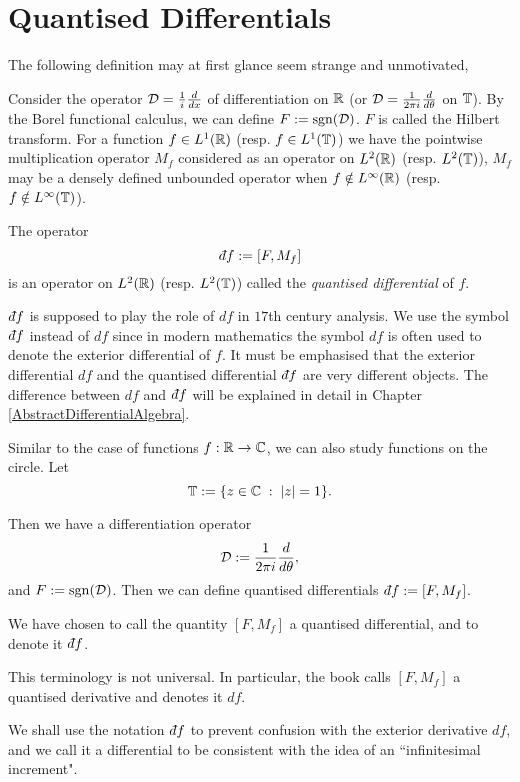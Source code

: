 \section{Quantised Differentials}
The following definition may at first glance seem strange and unmotivated,
\begin{definition}
    Consider the operator $\mathcal{D} = \frac{1}{i}\frac{d}{dx}$ of differentiation
    on $\mathbb{R}$ (or $\mathcal{D} = \frac{1}{2\pi i}\frac{d}{d\theta}$ on $\mathbb{T}$). By the Borel functional calculus, we can define $F := \operatorname{sgn}(\mathcal{D})$. 
    $F$ is called the Hilbert transform. For a function $f \in L^1(\mathbb{R})$ (resp. $f \in L^1(\mathbb{T})$)
    we have the pointwise multiplication
    operator $M_f$ considered as an operator on $L^2(\mathbb{R})$ (resp. $L^2(\mathbb{T})$), $M_f$
    may be a densely defined unbounded operator when $f \notin L^\infty(\mathbb{R})$ 
    (resp. $f \notin L^\infty(\mathbb{T})$).
    
    The operator
    \begin{equation}
        \qd f := [F,M_f]
    \end{equation}
    is an operator on $L^2(\mathbb{R})$ (resp. $L^2(\mathbb{T})$)
    called the \emph{quantised differential} of $f$.
\end{definition}

$\qd f$ is supposed to play the role of $df$ in $17$th century analysis. 
We use the symbol $\qd f$ instead of $df$ since in modern mathematics the symbol $df$
is often used to denote the exterior differential of $f$. It must be emphasised
that the exterior differential $df$ and the quantised differential $\qd f$ are very different objects.
The difference between $df$ and $\qd f$ will be explained in detail in Chapter \ref{AbstractDifferentialAlgebra}.

Similar to the case of functions $f:\mathbb{R}\rightarrow \mathbb{C}$, we can also
study functions on the circle. Let
\begin{equation}
    \mathbb{T} := \{z \in \mathbb{C}\;:\;|z| = 1\}.
\end{equation}

Then we have a differentiation operator 
\begin{equation}
    \mathcal{D} := \frac{1}{2\pi i} \frac{d}{d\theta},
\end{equation}
and $F := \operatorname{sgn}(\mathcal{D})$. Then we can define quantised
differentials $\qd f := [F,M_f]$. 

\begin{remark}
    We have chosen to call the quantity $[F,M_f]$
    a quantised differential, and to denote it $\qd f$. 
    
    This terminology is not universal. In particular, the book \cite[Ch. 4]{Connes94}
    calls $[F,M_f]$ a quantised derivative and denotes it $df$. 
    
    We shall use the notation $\qd f$ to prevent confusion with the exterior
    derivative $df$, and we call it a differential to be consistent
    with the idea of an ``infinitesimal increment".
\end{remark}    

